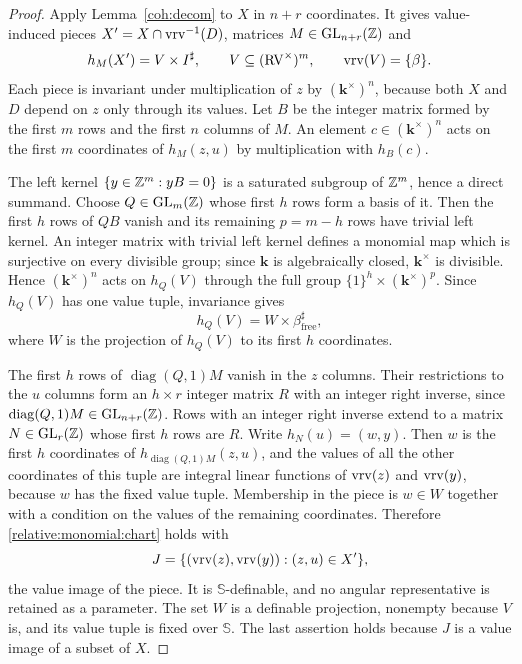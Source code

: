\begin{proof}
Apply Lemma~\ref{coh:decom} to $X$ in $n+r$ coordinates. It gives value-induced
pieces $X'=X\cap\operatorname{vrv}^{-1}(D)$, matrices $M\in\operatorname{GL}_{n+r}(\mathbb Z)$ and
\[
 h_M(X')=V\times I^\sharp,\qquad V\subseteq(\mathrm{RV}^\times)^{m},\qquad
 \operatorname{vrv}(V)=\{\beta\}.
\]
Each piece is invariant under multiplication of $z$ by $(\mathbf k^\times)^n$,
because both $X$ and $D$ depend on $z$ only through its values. Let $B$ be the
integer matrix formed by the first $m$ rows and the first $n$ columns of $M$.
An element $c\in(\mathbf k^\times)^n$ acts on the first $m$ coordinates of
$h_M(z,u)$ by multiplication with $h_B(c)$.

The left kernel $\{y\in\mathbb Z^m:yB=0\}$ is a saturated subgroup of $\mathbb Z^m$, hence
a direct summand. Choose $Q\in\operatorname{GL}_m(\mathbb Z)$ whose first $h$ rows form a basis of
it. Then the first $h$ rows of $QB$ vanish and its remaining $p=m-h$ rows
have trivial left kernel. An integer matrix with trivial left kernel defines
a monomial map which is surjective on every divisible group; since $\mathbf k$
is algebraically closed, $\mathbf k^\times$ is divisible. Hence $(\mathbf
k^\times)^n$ acts on $h_Q(V)$ through the full group $\{1\}^h\times(\mathbf
k^\times)^p$. Since $h_Q(V)$ has one value tuple, invariance gives
\[
 h_Q(V)=W\times\beta_{\mathrm{free}}^\sharp ,
\]
where $W$ is the projection of $h_Q(V)$ to its first $h$ coordinates.

The first $h$ rows of $\operatorname{diag}(Q,1)M$ vanish in the $z$
columns. Their restrictions to the $u$ columns form an $h\times r$ integer
matrix $R$ with an integer right inverse, since
$\operatorname{diag}(Q,1)M\in\operatorname{GL}_{n+r}(\mathbb Z)$. Rows with an integer right
inverse extend to a matrix $N\in\operatorname{GL}_r(\mathbb Z)$ whose first $h$ rows are $R$.
Write $h_N(u)=(w,y)$. Then $w$ is the first $h$ coordinates of
$h_{\operatorname{diag}(Q,1)M}(z,u)$, and the values of all the other
coordinates of this tuple are integral linear functions of $\operatorname{vrv}(z)$ and
$\operatorname{vrv}(y)$, because $w$ has the fixed value tuple. Membership in the piece
is $w\in W$ together with a condition on the values of the remaining
coordinates. Therefore \eqref{relative:monomial:chart} holds with
\[
 J=\{(\operatorname{vrv}(z),\operatorname{vrv}(y)):(z,u)\in X'\},
\]
the value image of the piece. It is $\mathbb S$-definable, and no angular
representative is retained as a parameter. The set $W$ is a definable
projection, nonempty because $V$ is, and its value tuple is fixed over
$\mathbb S$. The last assertion holds because $J$ is a value image of a
subset of $X$.
\end{proof}

